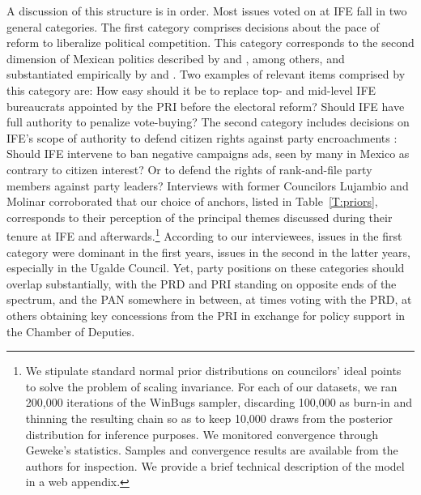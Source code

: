 \documentclass[12 pt, letter]{article}
\begin{document}
A discussion of this structure is in order. Most issues voted on at IFE fall in two general categories. The first category comprises decisions about the pace of reform to liberalize political competition. This category corresponds to the second dimension of Mexican politics described by \citet{Molinar1991} and \citet{Lujambio2001}, among others, and substantiated empirically by \citet{Moreno2003a} and \citet{Magaloni2006}.  Two examples of relevant items comprised by this category are: How easy should it be to replace top- and mid-level IFE bureaucrats appointed by the PRI before the electoral reform? Should IFE have full authority to penalize vote-buying?  The second category includes decisions on IFE's scope of authority to defend citizen rights against party encroachments \citep[cf][]{Cardenas2004}: Should IFE intervene to ban negative campaigns ads, seen by many in Mexico as contrary to citizen interest? Or to defend the rights of rank-and-file party members against party leaders? Interviews with former Councilors Lujambio and Molinar corroborated that our choice of anchors, listed in Table~\ref{T:priors}, corresponds  to their perception of the principal themes discussed during their tenure at IFE and afterwards.\footnote{We stipulate standard normal prior distributions on councilors' ideal points to solve the problem of scaling invariance. For each of our datasets, we ran 200,000 iterations of the WinBugs sampler, discarding 100,000 as burn-in and thinning the resulting chain so as to keep 10,000 draws from the posterior distribution for inference purposes. We monitored convergence through Geweke's statistics. Samples and convergence results are available from the authors for inspection. We provide a brief technical description of the model in a web appendix.}  According to our interviewees, issues in the first category were dominant in the first years, issues in the second in the latter years, especially in the Ugalde Council. Yet, party positions on these  categories should overlap substantially, with the PRD and PRI standing on opposite ends of the spectrum, and the PAN somewhere in between, at times voting with the PRD, at others obtaining key concessions from the PRI in exchange for policy support in the Chamber of Deputies.
\end{document}
